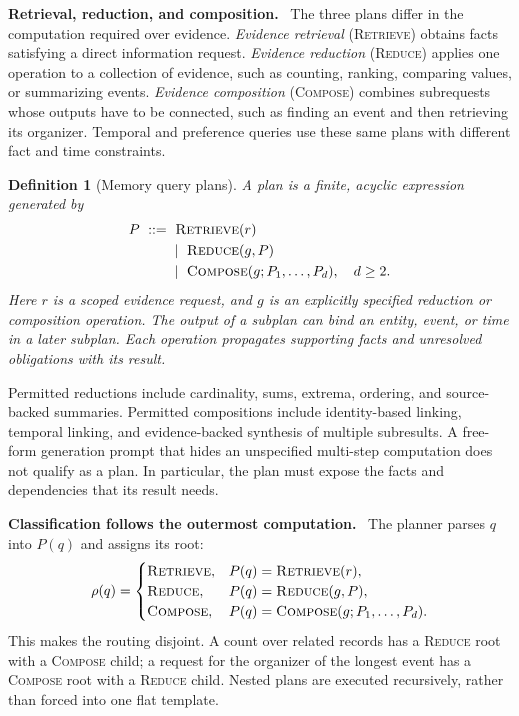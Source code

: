 \documentclass[10pt,twocolumn]{article}
\newcommand{\ret}{\textsc{Retrieve}}
\newcommand{\red}{\textsc{Reduce}}
\newcommand{\comp}{\textsc{Compose}}
\newcommand{\runin}[1]{\smallskip\noindent\textbf{#1.}\ }
\newtheorem{definition}{Definition}
\begin{document}
\runin{Retrieval, reduction, and composition}
The three plans differ in the computation required over evidence.
\emph{Evidence retrieval} (\ret) obtains facts satisfying a direct
information request. \emph{Evidence reduction} (\red) applies one
operation to a collection of evidence, such as counting, ranking,
comparing values, or summarizing events. \emph{Evidence composition}
(\comp) combines subrequests whose outputs have to be connected, such
as finding an event and then retrieving its organizer. Temporal and
preference queries use these same plans with different fact and time
constraints.

\begin{definition}[Memory query plans]
\label{def:new-plans}
A plan is a finite, acyclic expression generated by
\begin{equation}
\label{eq:new-plan-grammar}
\begin{split}
P\ ::={}&\ \ret(r)\\
       &\mid\ \red(g,P)\\
       &\mid\ \comp(g;P_1,\ldots,P_d),\quad d\geq2.
\end{split}
\end{equation}
Here $r$ is a scoped evidence request, and $g$ is an explicitly specified
reduction or composition operation. The output of a subplan can bind
an entity, event, or time in a later subplan. Each operation propagates
supporting facts and unresolved obligations with its result.
\end{definition}

Permitted reductions include cardinality, sums, extrema, ordering, and
source-backed summaries. Permitted compositions include identity-based
linking, temporal linking, and evidence-backed synthesis of multiple
subresults. A free-form generation prompt that hides an unspecified
multi-step computation does not qualify as a plan. In particular, the
plan must expose the facts and dependencies that its result needs.

\runin{Classification follows the outermost computation}
The planner parses $q$ into $P(q)$ and assigns its root:
\begin{equation}
\label{eq:new-route}
\rho(q)=
\begin{cases}
\ret, &P(q)=\ret(r),\\
\red, &P(q)=\red(g,P),\\
\comp,&P(q)=\comp(g;P_1,\ldots,P_d).
\end{cases}
\end{equation}
This makes the routing disjoint. A count over related records has a
\red{} root with a \comp{} child; a request for the organizer of the
longest event has a \comp{} root with a \red{} child. Nested plans are
executed recursively, rather than forced into one flat template.
\end{document}
